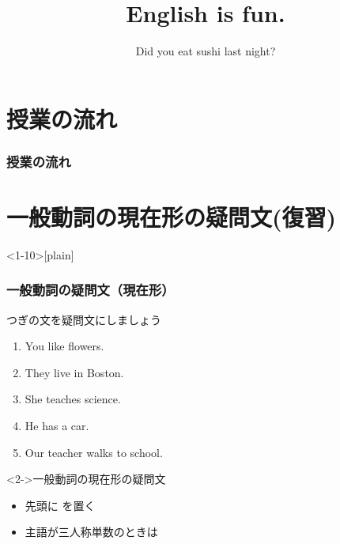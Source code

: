 \documentclass[aspectratio=169,xcolor={dvipsnames,table}]{beamer}
\title{English is fun.}
\subtitle{Did you eat sushi last night?}
\author{}
\institute[]{}
\date[]
\begin{document}
\begin{frame}[plain]
  \titlepage
\end{frame}

\section*{授業の流れ}
\begin{frame}[plain]
  \frametitle{授業の流れ}
  \tableofcontents
\end{frame}

\section{一般動詞の現在形の疑問文(復習)}
\begin{frame}<1-10>[plain]\frametitle{一般動詞の疑問文（現在形）}

{\small つぎの文を疑問文にしましょう}

 \begin{enumerate}
  \item<1-> You like flowers.\hspace{59.7pt}
  \item<1-> They live in Boston.\hspace{47.5pt}%
  \item<1-> She teaches science.\hspace{42pt}%
  \item<1-> He has  a car.\hspace{80.5pt}%
  \item<1-> Our teacher walks to school.
 \end{enumerate}

\begin{block}<2->{一般動詞の現在形の疑問文}
\begin{itemize}[square]\small
 \item<3->   先頭に  を置く\pause
 \item<4->   主語が三人称単数のときは 
\end{itemize}


\end{block}
\end{frame}
\end{document}
